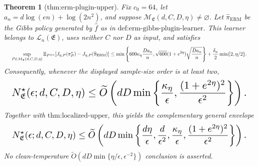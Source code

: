 \documentclass{article}
\newtheorem{theorem}{Theorem}
\begin{document}
\begin{theorem}[thm:erm-plugin-upper]\label{thm:erm-plugin-upper}
Fix \(c_0=64\), let \(a_n=d\log(en)+\log(2n^2)\), and suppose \(\mathcal M_{\mathfrak E}(d,C,D,\eta)\ne\varnothing\). Let \(\widehat\pi_{\mathrm{ERM}}\) be the Gibbs policy generated by \(\widehat f\) as in \(\text{def:erm-gibbs-plugin-learner}\). This learner belongs to \(\mathcal L_n(\mathfrak E)\), uses neither \(C\) nor \(D\) as input, and satisfies
\[
\makebox[\linewidth][c]{\resizebox{0.98\linewidth}{!}{\(\displaystyle \sup_{P\in\mathcal M_{\mathfrak E}(d,C,D,\eta)}
\mathbb E_{P^{\otimes n}}[J_{\eta,P}(\pi_P^\star)-J_{\eta,P}(\widehat\pi_{\mathrm{ERM}})]
\le
\min\left\{
600\kappa_\eta\frac{Da_n}{n},
\sqrt{600}(1+e^{2\eta})\sqrt{\frac{Da_n}{n}}
\right\}
+\frac{\delta_n}{2}\min\{2,\eta/2\}.\)}}
\]
Consequently, whenever the displayed sample-size order is at least two,
\[
\makebox[\linewidth][c]{\resizebox{0.98\linewidth}{!}{\(\displaystyle N^\star_{\mathfrak E}(\epsilon;d,C,D,\eta)
\le\widetilde O\left(
 dD\min\left\{
 \frac{\kappa_\eta}{\epsilon},
 \frac{(1+e^{2\eta})^2}{\epsilon^2}
 \right\}
\right).\)}}
\]
Together with \(\text{thm:localized-upper}\), this yields the complementary general envelope
\[
\makebox[\linewidth][c]{\resizebox{0.98\linewidth}{!}{\(\displaystyle N^\star_{\mathfrak E}(\epsilon;d,C,D,\eta)
\le\widetilde O\left(
 dD\min\left\{
 \frac{d\eta}{\epsilon},
 \frac d{\epsilon^2},
 \frac{\kappa_\eta}{\epsilon},
 \frac{(1+e^{2\eta})^2}{\epsilon^2}
 \right\}
\right).\)}}
\]
No clean-temperature \(\widetilde O(dD\min\{\eta/\epsilon,\epsilon^{-2}\})\) conclusion is asserted.
\end{theorem}
\end{document}
